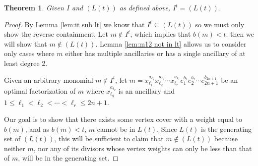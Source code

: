 \documentclass[12pt]{amsart}
\renewcommand{\geq}{\geqslant}
\renewcommand{\le}{\leqslant}
\theoremstyle{plain}
\newtheorem{theorem}{Theorem}[section]
\theoremstyle{definition}
\begin{document}
\begin{theorem}\label{lem:it<tl}\label{lem:tl<it}
Given $I$ and $(L(t))$ as defined above, $I^t = (L(t))$.
\end{theorem}
\begin{proof}
  By Lemma \ref{lem:it sub lt} we know that $I^t \subseteq (L(t))$ so we must only show the reverse containment. Let $m\not\in I^t$, which implies that $b(m) < t$; then we will show that $m\not\in (L(t))$. Lemma \ref{lem:m12 not in lt} allows us to consider only cases where $m$ either has multiple ancillaries or has a single ancillary of at least degree 2.

  Given an arbitrary monomial $m \not \in I^t$, let $m = x_{\ell_1}^{a_{\ell_1}} x_{\ell_2}^{a_{\ell_2}} \cdots x_{\ell_r}^{a_{\ell_r}} e_1^{b_1} e_2^{b_2} \cdots e_{2n+1}^{b_{2n+1}}$ be an optimal factorization of $m$ where $x_{\ell_q}^{a_{\ell_q}}$ is an ancillary and $1 \le \ell_1 < \ell_2 < \cdots < \ell_r \le 2n+1$.


Our goal is to show that there exists some vertex cover with a weight equal to $b(m)$, and as $b(m) < t$, $m$ cannot be in $L(t)$. Since $L(t)$ is the generating set of $(L(t))$, this will be sufficient to claim that $m \not \in (L(t))$ because neither $m$, nor any of its divisors whose vertex weights can only be less than that of $m$, will be in the generating set.



\end{proof}
\end{document}
